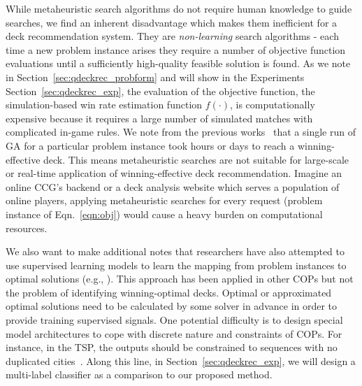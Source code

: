 While metaheuristic search algorithms do not require human knowledge to guide searches, we find an inherent disadvantage which makes them inefficient for a deck recommendation system. They are \textit{non-learning} search algorithms - each time a new problem instance arises they require a number of objective function evaluations until a sufficiently high-quality feasible solution is found. As we note in Section~\ref{sec:qdeckrec_probform} and will show in the Experiments Section~\ref{sec:qdeckrec_exp}, the evaluation of the objective function, the simulation-based win rate estimation function $f(\cdot)$, is computationally expensive because it requires a large number of simulated matches with complicated in-game rules. We note from the previous works~\cite{garcia2016evolutionary,bjorke2017deckbuilding} that a single run of GA for a particular problem instance took hours or days to reach a winning-effective deck. This means metaheuristic searches are not suitable for large-scale or real-time application of winning-effective deck recommendation. Imagine an online CCG's backend or a deck analysis website which serves a population of online players, applying metaheuristic searches for every request (problem instance of Eqn.~\ref{eqn:obj}) would cause a heavy burden on computational resources.


We also want to make additional notes that researchers have also attempted to use supervised learning models to learn the mapping from problem instances to optimal solutions (e.g., \cite{vinyals2015pointer}). This approach has been applied in other COPs but not the problem of identifying winning-optimal decks. Optimal or approximated optimal solutions need to be calculated by some solver in advance in order to provide training supervised signals. One potential difficulty is to design special model architectures to cope with discrete nature and constraints of COPs. For instance, in the TSP, the outputs should be constrained to sequences with no duplicated cities~\cite{vinyals2015pointer}. Along this line, in Section~\ref{sec:qdeckrec_exp}, we will design a multi-label classifier as a comparison to our proposed method.






